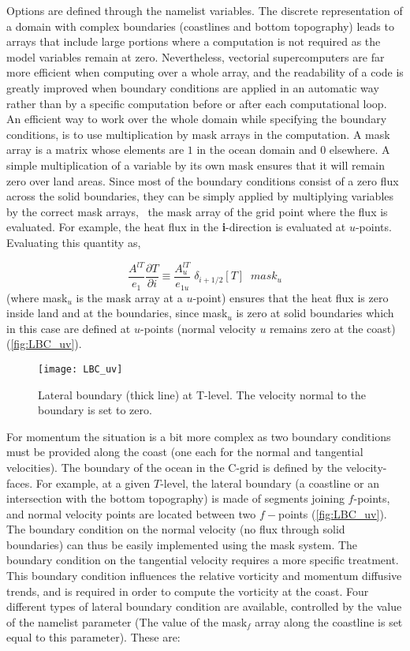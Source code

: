 \documentclass[../main/NEMO_manual]{subfiles}
\begin{document}
Options are defined through the  namelist variables.
The discrete representation of a domain with complex boundaries (coastlines and bottom topography) leads to
arrays that include large portions where a computation is not required as the model variables remain at zero.
Nevertheless, vectorial supercomputers are far more efficient when computing over a whole array,
and the readability of a code is greatly improved when boundary conditions are applied in
an automatic way rather than by a specific computation before or after each computational loop.
An efficient way to work over the whole domain while specifying the boundary conditions,
is to use multiplication by mask arrays in the computation.
A mask array is a matrix whose elements are $1$ in the ocean domain and $0$ elsewhere.
A simple multiplication of a variable by its own mask ensures that it will remain zero over land areas.
Since most of the boundary conditions consist of a zero flux across the solid boundaries,
they can be simply applied by multiplying variables by the correct mask arrays,
\ie\ the mask array of the grid point where the flux is evaluated.
For example, the heat flux in the \textbf{i}-direction is evaluated at $u$-points.
Evaluating this quantity as,

\[
  \frac{A^{lT} }{e_1 }\frac{\partial T}{\partial i}\equiv \frac{A_u^{lT}
  }{e_{1u} } \; \delta_{i+1 / 2} \left[ T \right]\;\;mask_u
\]
(where mask$_{u}$ is the mask array at a $u$-point) ensures that the heat flux is zero inside land and
at the boundaries, since mask$_{u}$ is zero at solid boundaries which in this case are defined at $u$-points
(normal velocity $u$ remains zero at the coast) (\autoref{fig:LBC_uv}).

\begin{figure}[h]
  \centering
  \texttt{[image: LBC\_uv]}
  \caption[Lateral boundary at $T$-level]{
    Lateral boundary (thick line) at T-level.
    The velocity normal to the boundary is set to zero.}
  \label{fig:LBC_uv}
\end{figure}

For momentum the situation is a bit more complex as two boundary conditions must be provided along the coast
(one each for the normal and tangential velocities).
The boundary of the ocean in the C-grid is defined by the velocity-faces.
For example, at a given $T$-level,
the lateral boundary (a coastline or an intersection with the bottom topography) is made of
segments joining $f$-points, and normal velocity points are located between two $f-$points (\autoref{fig:LBC_uv}).
The boundary condition on the normal velocity (no flux through solid boundaries)
can thus be easily implemented using the mask system.
The boundary condition on the tangential velocity requires a more specific treatment.
This boundary condition influences the relative vorticity and momentum diffusive trends,
and is required in order to compute the vorticity at the coast.
Four different types of lateral boundary condition are available,
controlled by the value of the  namelist parameter
(The value of the mask$_{f}$ array along the coastline is set equal to this parameter).
These are:
\end{document}
